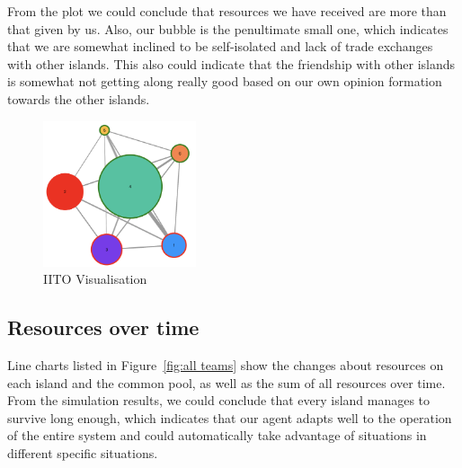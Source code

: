 From the plot we could conclude that resources we have received are more than that given by us. Also, our bubble is the penultimate small one, which indicates that we are somewhat inclined to be self-isolated and lack of trade exchanges with other islands. This also could indicate that the friendship with other islands is somewhat not getting along really good based on our own opinion formation towards the other islands.
\begin{figure}[H]
    \centering
    \includegraphics[width=0.4\textwidth, scale=0.1]{14_team6_agentdesign/images/IITO.png}
    \caption{IITO Visualisation}
    \label{fig:IITO}
\end{figure}

\subsection{Resources over time} \label{subsec:Team6_Eval_Resources}

Line charts listed in Figure~\ref{fig:all teams} show the changes about resources on each island and the common pool, as well as the sum of all resources over time. From the simulation results, we could conclude that every island manages to survive long enough, which indicates that our agent adapts well to the operation of the entire system and could automatically take advantage of situations in different specific situations. 


